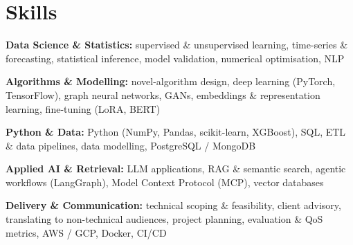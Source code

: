 \documentclass[10pt,a4paper]{article}
\begin{document}
\section{Skills}
\begin{tight}
  \item[\textcolor{accent}{\small$\bullet$}] \textbf{Data Science \& Statistics:} supervised \& unsupervised learning, time-series \& forecasting, statistical inference, model validation, numerical optimisation, NLP
  \item[\textcolor{accent}{\small$\bullet$}] \textbf{Algorithms \& Modelling:} novel-algorithm design, deep learning (PyTorch, TensorFlow), graph neural networks, GANs, embeddings \& representation learning, fine-tuning (LoRA, BERT)
  \item[\textcolor{accent}{\small$\bullet$}] \textbf{Python \& Data:} Python (NumPy, Pandas, scikit-learn, XGBoost), SQL, ETL \& data pipelines, data modelling, PostgreSQL / MongoDB
  \item[\textcolor{accent}{\small$\bullet$}] \textbf{Applied AI \& Retrieval:} LLM applications, RAG \& semantic search, agentic workflows (LangGraph), Model Context Protocol (MCP), vector databases
  \item[\textcolor{accent}{\small$\bullet$}] \textbf{Delivery \& Communication:} technical scoping \& feasibility, client advisory, translating to non-technical audiences, project planning, evaluation \& QoS metrics, AWS / GCP, Docker, CI/CD
\end{tight}

\end{document}
